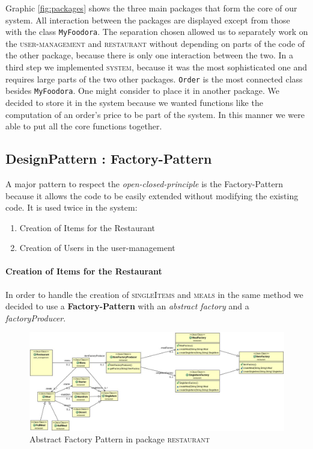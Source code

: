 Graphic \ref{fig:packages} shows the three main packages that form the core of our system. All
interaction between the packages are displayed except from those with the class
\lstinline|MyFoodora|. The separation chosen allowed us to separately work on the
\textsc{user-management} and \textsc{restaurant} without depending on parts of the code of the
other package, because there is only one interaction between the two. In a third step we
implemented \textsc{system}, because it was the most sophisticated one and requires large parts of
the two other packages. \lstinline|Order| is the most connected class besides
\lstinline|MyFoodora|.
One might consider to place it in another package. We decided to store it in the system
because we wanted functions like the computation of an order's price to be part of the system. In
this manner we were able to put all the core functions together. 

\subsection{DesignPattern : Factory-Pattern}
\label{sub:designpattern_factory_pattern}

A major pattern to respect the \textit{open-closed-principle} is the Factory-Pattern because it
allows the code to be easily extended without modifying the existing code. It is used twice in
the system:
\begin{enumerate}
	\item Creation of Items for the Restaurant
	\item Creation of Users in the user-management
\end{enumerate}

\paragraph{Creation of Items for the Restaurant}

In order to handle the creation of \textsc{singleItems} and \textsc{meals} in the same method we 
decided to use a \textbf{Factory-Pattern} with an \textit{abstract factory} and a
\textit{factoryProducer}. 

\begin{figure}[H]
	\centering
	\includegraphics[width=1\linewidth]{./ima/restaurant_factory_pattern.jpg}
	\caption{Abstract Factory Pattern in package \textsc{restaurant}}
	\label{fig:restaurant-factory-pattern}
\end{figure}

